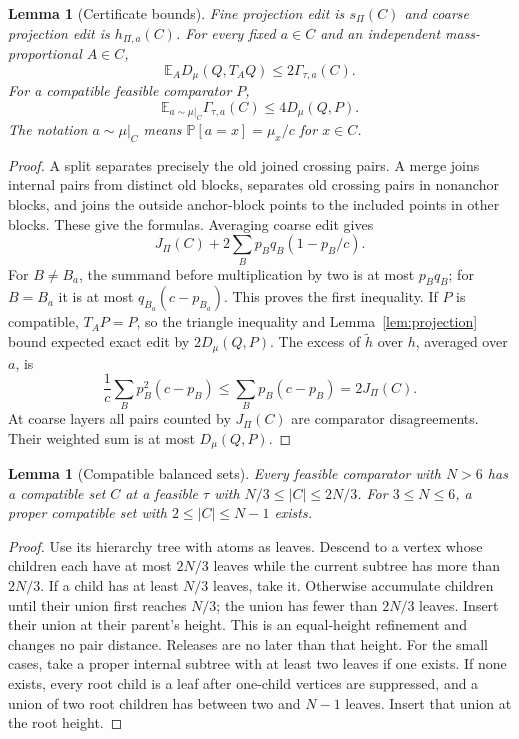 \documentclass[11pt]{article}
\newtheorem{lemma}[theorem]{Lemma}
\theoremstyle{definition}
\newcommand{\E}{\mathbb E}
\newcommand{\Prb}{\mathbb P}
\begin{document}
\begin{lemma}[Certificate bounds]\label{lem:certificate}
Fine projection edit is $s_\Pi(C)$ and coarse projection edit is
$h_{\Pi,a}(C)$. For every fixed $a\in C$ and an independent
mass-proportional $A\in C$,
\[
 \E_A D_\mu(Q,T_AQ)\le2\Gamma_{\tau,a}(C).
\]
For a compatible feasible comparator $P$,
\[
 \E_{a\sim\mu|_C}\Gamma_{\tau,a}(C)\le4D_\mu(Q,P).
\]
The notation $a\sim\mu|_C$ means $\Prb[a=x]=\mu_x/c$ for $x\in C$.
\end{lemma}
\begin{proof}
A split separates precisely the old joined crossing pairs.
A merge joins internal pairs from distinct old blocks, separates old
crossing pairs in nonanchor blocks, and joins the outside anchor-block
points to the included points in other blocks. These give the formulas.
Averaging coarse edit gives
\[
 J_\Pi(C)+2\sum_Bp_Bq_B(1-p_B/c).
\]
For $B\ne B_a$, the summand before multiplication by two is at most
$p_Bq_B$; for $B=B_a$ it is at most $q_{B_a}(c-p_{B_a})$.
This proves the first inequality.
If $P$ is compatible, $T_AP=P$, so the triangle inequality and
Lemma~\ref{lem:projection} bound expected exact edit by $2D_\mu(Q,P)$.
The excess of $\widetilde h$ over $h$, averaged over $a$, is
\[
 \frac1c\sum_Bp_B^2(c-p_B)
 \le\sum_Bp_B(c-p_B)=2J_\Pi(C).
\]
At coarse layers all pairs counted by $J_\Pi(C)$ are comparator
disagreements. Their weighted sum is at most $D_\mu(Q,P)$.
\end{proof}

\begin{lemma}[Compatible balanced sets]\label{lem:balanced}
Every feasible comparator with $N>6$ has a compatible set $C$ at a feasible
$\tau$ with $N/3\le|C|\le2N/3$. For $3\le N\le6$, a proper compatible set
with $2\le|C|\le N-1$ exists.
\end{lemma}
\begin{proof}
Use its hierarchy tree with atoms as leaves. Descend to a vertex whose
children each have at most $2N/3$ leaves while the current subtree has
more than $2N/3$. If a child has at least $N/3$ leaves, take it.
Otherwise accumulate children until their union first reaches $N/3$;
the union has fewer than $2N/3$ leaves. Insert their union at their
parent's height. This is an equal-height refinement and changes no pair
distance. Releases are no later than that height. For the small cases,
take a proper internal subtree with at least two leaves if one exists.
If none exists, every root child is a leaf after one-child vertices are
suppressed, and a union of two root children has between two and $N-1$
leaves. Insert that union at the root height.
\end{proof}
\end{document}
